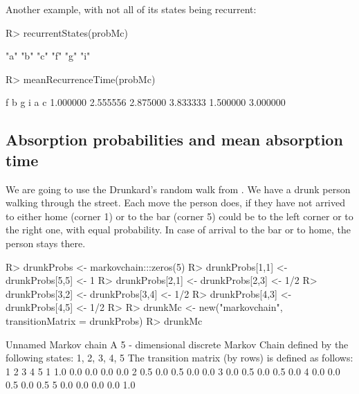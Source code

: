 \documentclass[
  nojss]{jss}
\begin{document}
Another example, with not all of its states being recurrent:

\begin{CodeChunk}
\begin{CodeInput}
R> recurrentStates(probMc)
\end{CodeInput}
\begin{CodeOutput}
[1] "a" "b" "c" "f" "g" "i"
\end{CodeOutput}
\begin{CodeInput}
R> meanRecurrenceTime(probMc)
\end{CodeInput}
\begin{CodeOutput}
       f        b        g        i        a        c 
1.000000 2.555556 2.875000 3.833333 1.500000 3.000000 
\end{CodeOutput}
\end{CodeChunk}

\subsection{Absorption probabilities and mean absorption time}\label{absorption-probabilities-and-mean-absorption-time}

We are going to use the Drunkard's random walk from \citep{GrinsteadSnell}. We have a drunk person walking through the street. Each move the person does, if they have not arrived to either home (corner 1) or to the bar (corner 5) could be to the left corner or to the right one, with equal probability. In case of arrival to the bar or to home, the person stays there.

\begin{CodeChunk}
\begin{CodeInput}
R> drunkProbs <- markovchain:::zeros(5)
R> drunkProbs[1,1] <- drunkProbs[5,5] <- 1
R> drunkProbs[2,1] <- drunkProbs[2,3] <- 1/2
R> drunkProbs[3,2] <- drunkProbs[3,4] <- 1/2
R> drunkProbs[4,3] <- drunkProbs[4,5] <- 1/2
R> 
R> drunkMc <- new("markovchain", transitionMatrix = drunkProbs)
R> drunkMc
\end{CodeInput}
\begin{CodeOutput}
Unnamed Markov chain 
 A  5 - dimensional discrete Markov Chain defined by the following states: 
 1, 2, 3, 4, 5 
 The transition matrix  (by rows)  is defined as follows: 
    1   2   3   4   5
1 1.0 0.0 0.0 0.0 0.0
2 0.5 0.0 0.5 0.0 0.0
3 0.0 0.5 0.0 0.5 0.0
4 0.0 0.0 0.5 0.0 0.5
5 0.0 0.0 0.0 0.0 1.0
\end{CodeOutput}
\end{CodeChunk}
\end{document}
